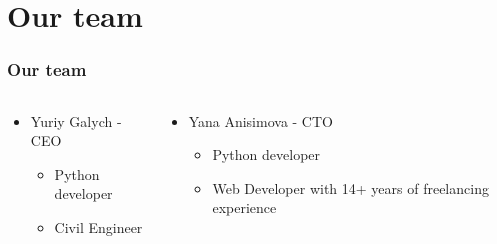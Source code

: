 \documentclass[aspectratio=169]{beamer}
\begin{document}
\section{Our team}

\begin{frame}
    \frametitle{Our team}
    
    \begin{columns}
         
        \begin{column}{0.5\textwidth}
            \vspace{1cm}
            \begin{itemize}
                \item Yuriy Galych - CEO
                \begin{itemize}
                    \item Python developer
                    \item Civil Engineer
                \end{itemize}
            \end{itemize}
        \end{column}
        
        \begin{column}{0.5\textwidth}
            \vspace{1cm}
            \begin{itemize}
                \item Yana Anisimova - CTO
                \begin{itemize}
                    \item Python developer
                    \item Web Developer with 14+ years of freelancing experience
                \end{itemize}
            \end{itemize}
        \end{column}

    \end{columns}
    
\end{frame}
\end{document}
